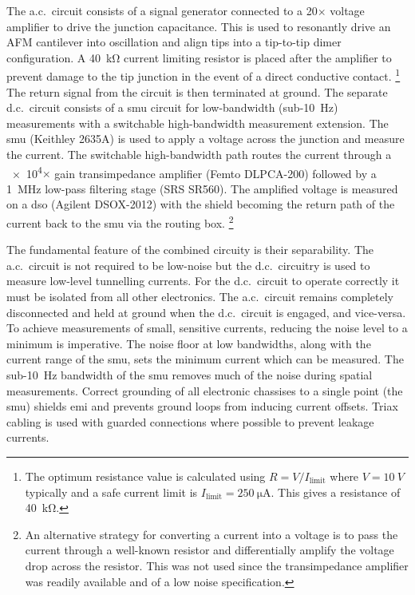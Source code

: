 \documentclass{article}
\begin{document}
The a.c.\ circuit consists of a signal generator connected to a 20$\times$ voltage amplifier to drive the junction capacitance. This is used to resonantly drive an AFM cantilever into oscillation and align tips into a tip-to-tip dimer configuration. A \SI{40}{\kilo\ohm} current limiting resistor is placed after the amplifier to prevent damage to the tip junction in the event of a direct conductive contact.%
\footnote{The optimum resistance value is calculated using $R = V/I_{\mathrm{limit}}$ where $V=\SI{10}{V}$ typically and a safe current limit is $I_{\mathrm{limit}}=\SI{250}{\micro\ampere}$. This gives a resistance of \SI{40}{\kilo\ohm}.}
The return signal from the circuit is then terminated at ground. The separate d.c.\ circuit consists of a \gls{smu} circuit for low-bandwidth (sub-\SI{10}{Hz}) measurements with a switchable high-bandwidth measurement extension. The \gls{smu} (Keithley 2635A) is used to apply a voltage across the junction and measure the current. The switchable high-bandwidth path routes the current through a \num{e4}$\times$ gain transimpedance amplifier (Femto DLPCA-200) followed by a \SI{1}{MHz} low-pass filtering stage (SRS SR560). The amplified voltage is measured on a \gls{dso} (Agilent DSOX-2012) with the shield becoming the return path of the current back to the \gls{smu} via the routing box.%
\footnote{An alternative strategy for converting a current into a voltage is to pass the current through a well-known resistor and differentially amplify the voltage drop across the resistor. This was not used since the transimpedance amplifier was readily available and of a low noise specification.}

The fundamental feature of the combined circuity is their separability. The a.c.\ circuit is not required to be low-noise but the d.c.\ circuitry is used to measure low-level tunnelling currents. For the d.c.\ circuit to operate correctly it must be isolated from all other electronics. The a.c.\ circuit remains completely disconnected and held at ground when the d.c.\ circuit is engaged, and vice-versa.
To achieve measurements of small, sensitive currents, reducing the noise level to a minimum is imperative. The noise floor at low bandwidths, along with the current range of the \gls{smu}, sets the minimum current which can be measured. The sub-\SI{10}{Hz} bandwidth of the \gls{smu} removes much of the noise during spatial measurements. Correct grounding of all electronic chassises to a single point (the \gls{smu}) shields \gls{emi} and prevents ground loops from inducing current offsets. Triax cabling is used with guarded connections where possible to prevent leakage currents.
\end{document}
